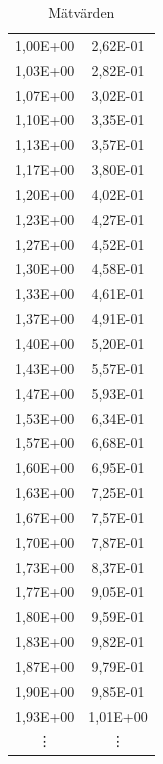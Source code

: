 \documentclass[11p, titlepage, oneside, a4paper]{article}
\begin{document}
\begin{table}
\begin{center}
\begin{tabular}{ |c|c| }
                1,00E+00 & 2,62E-01 \\
                1,03E+00 & 2,82E-01 \\
                1,07E+00 & 3,02E-01 \\
                1,10E+00 & 3,35E-01 \\
                1,13E+00 & 3,57E-01 \\
                1,17E+00 & 3,80E-01 \\
                1,20E+00 & 4,02E-01 \\
                1,23E+00 & 4,27E-01 \\
                1,27E+00 & 4,52E-01 \\
                1,30E+00 & 4,58E-01 \\
                1,33E+00 & 4,61E-01 \\
                1,37E+00 & 4,91E-01 \\
                1,40E+00 & 5,20E-01 \\
                1,43E+00 & 5,57E-01 \\
                1,47E+00 & 5,93E-01 \\
                1,53E+00 & 6,34E-01 \\
                1,57E+00 & 6,68E-01 \\
                1,60E+00 & 6,95E-01 \\
                1,63E+00 & 7,25E-01 \\
                1,67E+00 & 7,57E-01 \\
                1,70E+00 & 7,87E-01 \\
                1,73E+00 & 8,37E-01 \\
                1,77E+00 & 9,05E-01 \\
                1,80E+00 & 9,59E-01 \\
                1,83E+00 & 9,82E-01 \\
                1,87E+00 & 9,79E-01 \\
                1,90E+00 & 9,85E-01 \\
                1,93E+00 & 1,01E+00 \\

                \vdots & \vdots \\
                \hline
            \end{tabular}
                \caption{Mätvärden}
                \label{table:result}
            \end{center}
        \end{table}            
        
\end{document}
